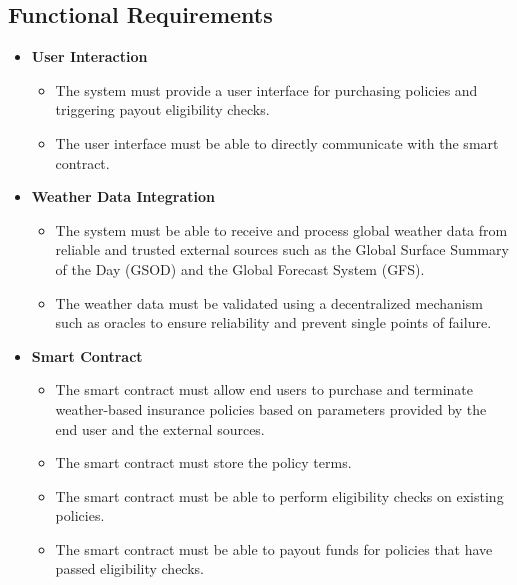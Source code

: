 \subsection{Functional Requirements}\label{subsection:functionalRequirements}
\begin{itemize}
    \item \textbf{User Interaction}
    \begin{itemize}
        \item The system must provide a user interface for purchasing policies and triggering payout eligibility checks.
        \item The user interface must be able to directly communicate with the smart contract.
    \end{itemize}

    \item \textbf{Weather Data Integration} 
    \begin{itemize}
        \item The system must be able to receive and process global weather data from reliable and trusted external sources such as the Global Surface Summary of the Day (GSOD) and the Global Forecast System (GFS).
        \item The weather data must be validated using a decentralized mechanism such as oracles to ensure reliability and prevent single points of failure.
    \end{itemize}
    
    \item \textbf{Smart Contract}
    \begin{itemize}
        \item The smart contract must allow end users to purchase and terminate weather-based insurance policies based on parameters provided by the end user and the external sources.
        \item The smart contract must store the policy terms.
        \item The smart contract must be able to perform eligibility checks on existing policies.
        \item The smart contract must be able to payout funds for policies that have passed eligibility checks.
    \end{itemize}
\end{itemize}

